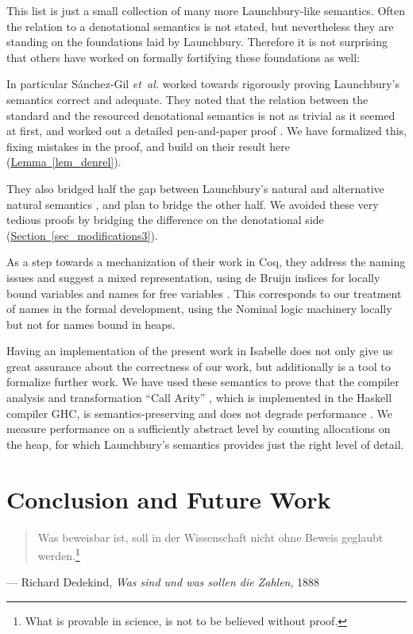 \documentclass{jfp1}
\newcommand{\myref}[2]{\hyperref[#2]{#1~\ref*{#2}}}
\theoremstyle{nonumberbreak}
\begin{document}
\smallskip

This list is just a small collection of many more Launchbury-like semantics. Often the relation to a denotational semantics is not stated, but nevertheless they are standing on the foundations laid by Launchbury. Therefore it is not surprising that others have worked on formally fortifying these foundations as well:

In particular S{\'a}nchez-Gil {\em et~al.} worked towards rigorously proving Launchbury's semantics correct and adequate. They noted that the relation between the standard and the resourced denotational semantics is not as trivial as it seemed at first, and worked out a detailed pen-and-paper proof . We have formalized this, fixing mistakes in the proof, and build on their result here (\myref{Lemma}{lem_denrel}).

They also bridged half the gap between Launchbury's natural and alternative natural semantics \cite{indirections}, and plan to bridge the other half. We avoided these very tedious proofs by bridging the difference on the denotational side (\myref{Section}{sec_modifications3}).

As a step towards a mechanization of their work in Coq, they address the naming issues and suggest a mixed representation, using de Bruijn indices for locally bound variables and names for free variables . This corresponds to our treatment of names in the formal development, using the Nominal logic machinery \cite{nominal} locally but not for names bound in heaps.

\smallskip

Having an implementation of the present work in Isabelle does not only give us great assurance about the correctness of our work, but additionally is a tool to formalize further work. We have used these semantics to prove that the compiler analysis and transformation ``Call Arity'' \cite{tfp}, which is implemented in the Haskell compiler GHC, is semantics-preserving and does not degrade performance \cite{arity-haskell,arity-afp}. We measure performance on a sufficiently abstract level by counting allocations on the heap, for which Launchbury’s semantics provides just the right level of detail.


\section{Conclusion and Future Work}

\begin{quote}
Was beweisbar ist, soll in der Wissenschaft nicht ohne Beweis geglaubt werden.\footnote{
What is provable in science, is not to be believed without proof.}
\end{quote}
\begin{qtsource}
--- Richard Dedekind, \textit{Was sind und was sollen die Zahlen}, 1888
\end{qtsource}
\smallskip
\end{document}
